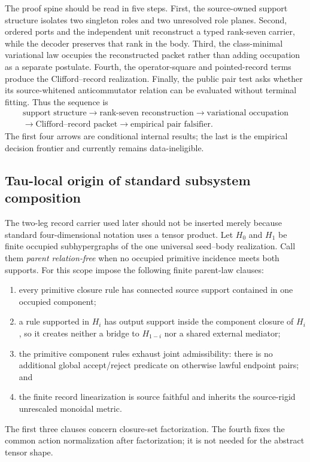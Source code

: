 \documentclass[11pt]{article}
\begin{document}
The proof spine should be read in five steps.  First, the source-owned support
structure isolates two singleton roles and two unresolved role planes.
Second, ordered ports and the independent unit reconstruct a typed rank-seven
carrier, while the decoder preserves that rank in the body.  Third, the
class-minimal variational law occupies the reconstructed packet rather than
adding occupation as a separate postulate.  Fourth, the operator-square and
pointed-record terms produce the Clifford--record realization.  Finally, the
public pair test asks whether its source-whitened anticommutator relation can
be evaluated without terminal fitting.  Thus the sequence is
\[
 \begin{gathered}
 \text{support structure}
 \longrightarrow \text{rank-seven reconstruction}
 \longrightarrow \text{variational occupation}
 \\
 \longrightarrow \text{Clifford--record packet}
 \longrightarrow \text{empirical pair falsifier}.
 \end{gathered}
\]
The first four arrows are conditional internal results; the last is the
empirical decision frontier and currently remains data-ineligible.

\subsection{Tau-local origin of standard subsystem composition}
\label{sec:taustandardcomposition}

The two-leg record carrier used later should not be inserted merely because
standard four-dimensional notation uses a tensor product.  Let $H_0$ and
$H_1$ be finite occupied subhypergraphs of the one universal seed--body
realization.  Call them \emph{parent relation-free} when no occupied primitive
incidence meets both supports.  For this scope impose the following finite
parent-law clauses:
\begin{enumerate}[label=(LC\arabic*),nosep]
\item every primitive closure rule has connected source support contained in
  one occupied component;
\item a rule supported in $H_i$ has output support inside the component
  closure of $H_i$, so it creates neither a bridge to $H_{1-i}$ nor a shared
  external mediator;
\item the primitive component rules exhaust joint admissibility: there is no
  additional global accept/reject predicate on otherwise lawful endpoint
  pairs; and
\item the finite record linearization is source faithful and inherits the
  source-rigid unrescaled monoidal metric.
\end{enumerate}
The first three clauses concern closure-set factorization.  The fourth fixes
the common action normalization after factorization; it is not needed for the
abstract tensor shape.
\end{document}
